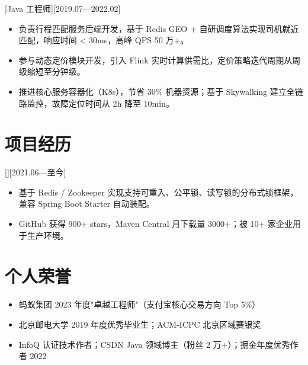 \documentclass{resume-photo}
\begin{document}
[\textnormal{Java 工程师}][2019.07—2022.02]
\begin{itemize}
  \item 负责行程匹配服务后端开发，基于 Redis GEO + 自研调度算法实现司机就近匹配，响应时间 < 30ms，高峰 QPS 50 万+。
  \item 参与动态定价模块开发，引入 Flink 实时计算供需比，定价策略迭代周期从周级缩短至分钟级。
  \item 推进核心服务容器化（K8s），节省 30\% 机器资源；基于 Skywalking 建立全链路监控，故障定位时间从 2h 降至 10min。
\end{itemize}

\section{项目经历}

[][2021.06—至今]
\begin{itemize}
  \item 基于 Redis / Zookeeper 实现支持可重入、公平锁、读写锁的分布式锁框架，兼容 Spring Boot Starter 自动装配。
  \item GitHub 获得 900+ stars，Maven Central 月下载量 3000+；被 10+ 家企业用于生产环境。
\end{itemize}

\section{个人荣誉}
\begin{itemize}
  \item 蚂蚁集团 2023 年度"卓越工程师"（支付宝核心交易方向 Top 5\%）
  \item 北京邮电大学 2019 年度优秀毕业生；ACM-ICPC 北京区域赛银奖
  \item InfoQ 认证技术作者；CSDN Java 领域博主（粉丝 2 万+）；掘金年度优秀作者 2022
\end{itemize}
\end{document}
